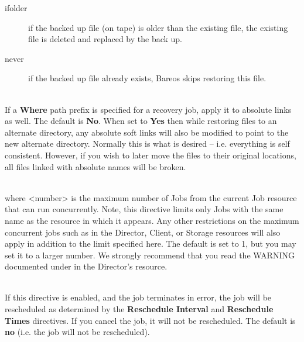 \begin{description}
\begin{description}
\item [ifolder]
if the backed up file (on tape) is older than the existing file, the
existing file is deleted and replaced by the back up.

\item [never]
if the backed up file already exists, Bareos skips  restoring this file.
\end{description}

\item [Prefix Links={\textless}yes{\textbar}no{\textgreater}] \hfill \\
If a {\bf Where} path prefix is specified for a recovery job, apply it
to absolute links as well.  The default is {\bf No}.  When set to {\bf
Yes} then while restoring files to an alternate directory, any absolute
soft links will also be modified to point to the new alternate
directory.  Normally this is what is desired -- i.e.  everything is self
consistent.  However, if you wish to later move the files to their
original locations, all files linked with absolute names will be broken.

\item [Maximum Concurrent Jobs = {\textless}number{\textgreater}] \hfill \\
where {\textless}number{\textgreater} is the maximum number of Jobs from the current
Job resource that can run concurrently.  Note, this directive limits
only Jobs with the same name as the resource in which it appears.  Any
other restrictions on the maximum concurrent jobs such as in the
Director, Client, or Storage resources will also apply in addition to
the limit specified here.  The default is set to 1, but you may set it
to a larger number.  We strongly recommend that you read the WARNING
documented under  in the
Director's resource.

\item [Reschedule On Error = {\textless}yes{\textbar}no{\textgreater}] \hfill \\
If this directive is enabled, and the job terminates in error, the job
will be rescheduled as determined by the {\bf Reschedule Interval} and
{\bf Reschedule Times} directives.  If you cancel the job, it will not
be rescheduled.  The default is {\bf no} (i.e.  the job will not be
rescheduled).


\end{description}
